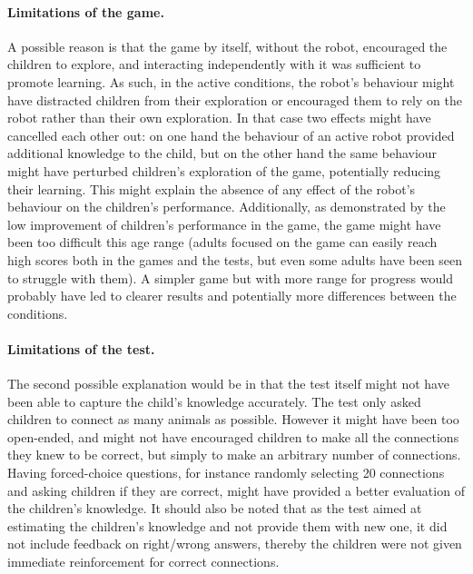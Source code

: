 \paragraph{Limitations of the game.} A possible reason is that the game by itself, without the robot, encouraged the children to explore, and interacting independently with it was sufficient to promote learning. As such, in the active conditions, the robot's behaviour might have distracted children from their exploration or encouraged them to rely on the robot rather than their own exploration. In that case two effects might have cancelled each other out: on one hand the behaviour of an active robot provided additional knowledge to the child, but on the other hand the same behaviour might have perturbed children's exploration of the game, potentially reducing their learning. This might explain the absence of any effect of the robot's behaviour on the children's performance. Additionally, as demonstrated by the low improvement of children's performance in the game, the game might have been too difficult this age range (adults focused on the game can easily reach high scores both in the games and the tests, but even some adults have been seen to struggle with them). A simpler game but with more range for progress would probably have led to clearer results and potentially more differences between the conditions.

\paragraph{Limitations of the test.} The second possible explanation would be in that the test itself might not have been able to capture the child's knowledge accurately. The test only asked children to connect as many animals as possible. However it might have been too open-ended, and might not have encouraged children to make all the connections they knew to be correct, but simply to make an arbitrary number of connections. %
Having forced-choice questions, for instance randomly selecting 20 connections and asking children if they are correct, might have provided a better evaluation of the children's knowledge. It should also be noted that as the test aimed at estimating the children's knowledge and not provide them with new one, it did not include feedback on right/wrong answers, thereby the children were not given immediate reinforcement for correct connections. 

